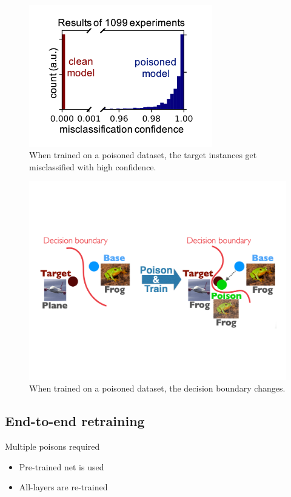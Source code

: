 \documentclass[11pt]{article}
\numberwithin{equation}{section}
\begin{document}
\begin{figure}[!h]
	\centering
	\includegraphics[width=8cm]{figures/P_misclassify.pdf}
	\caption{When trained on a poisoned dataset, the target instances get misclassified with high confidence.}
	\label{fig:P_misclassify}
\end{figure}

\begin{figure}[!h]
	\centering
	\includegraphics[width=14cm]{figures/One_boundary.pdf}
	\caption{When trained on a poisoned dataset, the decision boundary changes.}
	\label{fig:One_boundary}
\end{figure}

\subsection{End-to-end retraining}
\colorbox{orange!15}{Multiple poisons required}

\begin{itemize}
    \item Pre-trained net is used
    \item All-layers are re-trained
\end{itemize}
\end{document}
